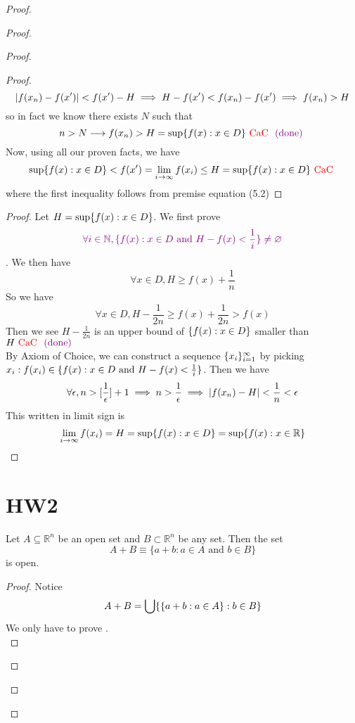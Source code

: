 \documentclass{report}
\begin{document}
\begin{proof}
\begin{proof}
\begin{proof}
\begin{proof}
\begin{equation}
|f(x_n)-f(x')|<f(x')-H\implies H-f(x')< f(x_n)-f(x')\implies f(x_n)>H
\end{equation}
so in fact we know there exists $N$ such that 
\begin{equation}
n>N \longrightarrow f(x_n)>H= \sup \{ f(x): x \in D \}\text{ \textcolor{red}{CaC} }\textcolor{violet}{\text{ (done) }}
\end{equation}
Now, using all our proven facts, we have
\begin{equation}
\sup \{ f(x): x\in D \}<f(x')=\lim_{i\to \infty }f(x_i)\leq H=\sup \{ f(x): x \in D \}\text{ \textcolor{red}{CaC} }
\end{equation}
where the first inequality follows from premise equation (5.2) 
\end{proof}
\begin{proof}
Let $H=\sup \{ f(x): x \in D \}$. We first prove
\begin{equation}
\textcolor{violet}{\forall i \in \mathbb{N}, \{ f(x): x \in D\text{ and }H-f(x)<\frac{1}{i} \}\neq \varnothing}
\end{equation}
. We then have
\begin{equation}
\forall x\in D, H\geq f(x)+\frac{1}{n}
\end{equation}
So we have
\begin{equation}
\forall x\in D, H-\frac{1}{2n}\geq f(x)+\frac{1}{2n}>f(x)
\end{equation}
Then we see $H-\frac{1}{2n}$ is an upper bound of $\{ f(x): x \in D \}$ smaller than $H\text{ \textcolor{red}{CaC} }\textcolor{violet}{\text{ (done) }}$\\

By Axiom of Choice, we can construct a sequence $\{ x_i \}_{i=1}^\infty$ by picking $x_i: f(x_i)\in \{ f(x):x \in D\text{ and }H-f(x)<\frac{1}{i} \}$. Then we have
\begin{equation}
\forall \epsilon, n> [\frac{1}{\epsilon }]+1\implies n>\frac{1}{\epsilon }\implies |f(x_n)-H|<\frac{1}{n}<\epsilon 
\end{equation}
This written in limit sign is 
\begin{equation}
\lim_{i\to \infty}f(x_i)=H=\sup \{ f(x): x\in D \}=\sup \{ f(x):x \in\mathbb{R} \}
\end{equation}
\end{proof}
\section{HW2}
\begin{question}{}{}

Let \(A \subseteq \mathbb{R}^n\) be an open set and \(B \subset \mathbb{R}^n\) be any set. Then the set 
\[ A + B \equiv \{a + b : a \in A \text{ and } b \in B\} \]
is open.
\end{question}
\begin{proof}
Notice 
\begin{equation}
A+B= \bigcup \{ \{ a+b:a\in A \}:b\in B \}
\end{equation}
We only have to prove  .\\


\end{proof}
\end{proof}
\end{proof}
\end{proof}
\end{document}
